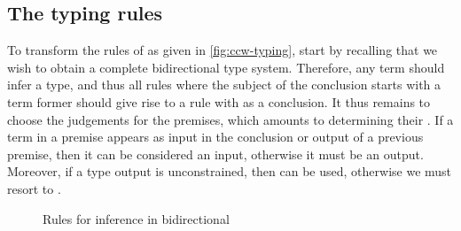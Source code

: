 \subsection{The typing rules}

To transform the rules of  as given in \cref{fig:ccw-typing}, 
start by recalling that we wish to obtain a complete bidirectional type system.
Therefore, any term should infer a type, and thus
all rules where the subject of the conclusion starts with a term former
should give rise to a rule with  as a conclusion.
It thus remains to choose the judgements for the premises,
which amounts to determining their .
If a term in a premise appears as input in the conclusion or output of a previous premise, then it can be considered an input, otherwise it must be an output. Moreover, if a type output is unconstrained, then  can be used, otherwise we must resort to
.

\begin{figure}[ht]
  \ContinuedFloat*
  \caption{Rules for inference in bidirectional }
  \label{fig:ccw-bidir-infer}
\end{figure}


